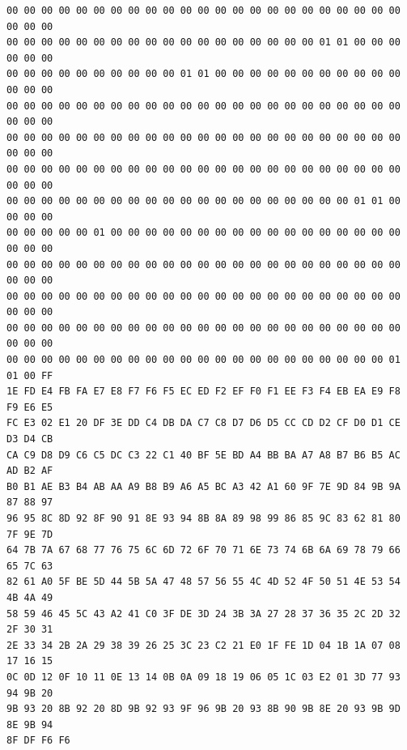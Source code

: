 \documentclass[a4paper]{article}
\begin{document}
\begin{verbatim}
00 00 00 00 00 00 00 00 00 00 00 00 00 00 00 00 00 00 00 00 00 00 00 00 00 00
00 00 00 00 00 00 00 00 00 00 00 00 00 00 00 00 00 00 01 01 00 00 00 00 00 00
00 00 00 00 00 00 00 00 00 00 01 01 00 00 00 00 00 00 00 00 00 00 00 00 00 00
00 00 00 00 00 00 00 00 00 00 00 00 00 00 00 00 00 00 00 00 00 00 00 00 00 00
00 00 00 00 00 00 00 00 00 00 00 00 00 00 00 00 00 00 00 00 00 00 00 00 00 00
00 00 00 00 00 00 00 00 00 00 00 00 00 00 00 00 00 00 00 00 00 00 00 00 00 00
00 00 00 00 00 00 00 00 00 00 00 00 00 00 00 00 00 00 00 00 01 01 00 00 00 00
00 00 00 00 00 01 00 00 00 00 00 00 00 00 00 00 00 00 00 00 00 00 00 00 00 00
00 00 00 00 00 00 00 00 00 00 00 00 00 00 00 00 00 00 00 00 00 00 00 00 00 00
00 00 00 00 00 00 00 00 00 00 00 00 00 00 00 00 00 00 00 00 00 00 00 00 00 00
00 00 00 00 00 00 00 00 00 00 00 00 00 00 00 00 00 00 00 00 00 00 00 00 00 00
00 00 00 00 00 00 00 00 00 00 00 00 00 00 00 00 00 00 00 00 00 00 01 01 00 FF
1E FD E4 FB FA E7 E8 F7 F6 F5 EC ED F2 EF F0 F1 EE F3 F4 EB EA E9 F8 F9 E6 E5
FC E3 02 E1 20 DF 3E DD C4 DB DA C7 C8 D7 D6 D5 CC CD D2 CF D0 D1 CE D3 D4 CB
CA C9 D8 D9 C6 C5 DC C3 22 C1 40 BF 5E BD A4 BB BA A7 A8 B7 B6 B5 AC AD B2 AF
B0 B1 AE B3 B4 AB AA A9 B8 B9 A6 A5 BC A3 42 A1 60 9F 7E 9D 84 9B 9A 87 88 97
96 95 8C 8D 92 8F 90 91 8E 93 94 8B 8A 89 98 99 86 85 9C 83 62 81 80 7F 9E 7D
64 7B 7A 67 68 77 76 75 6C 6D 72 6F 70 71 6E 73 74 6B 6A 69 78 79 66 65 7C 63
82 61 A0 5F BE 5D 44 5B 5A 47 48 57 56 55 4C 4D 52 4F 50 51 4E 53 54 4B 4A 49
58 59 46 45 5C 43 A2 41 C0 3F DE 3D 24 3B 3A 27 28 37 36 35 2C 2D 32 2F 30 31
2E 33 34 2B 2A 29 38 39 26 25 3C 23 C2 21 E0 1F FE 1D 04 1B 1A 07 08 17 16 15
0C 0D 12 0F 10 11 0E 13 14 0B 0A 09 18 19 06 05 1C 03 E2 01 3D 77 93 94 9B 20
9B 93 20 8B 92 20 8D 9B 92 93 9F 96 9B 20 93 8B 90 9B 8E 20 93 9B 9D 8E 9B 94
8F DF F6 F6
\end{verbatim}
\end{document}
